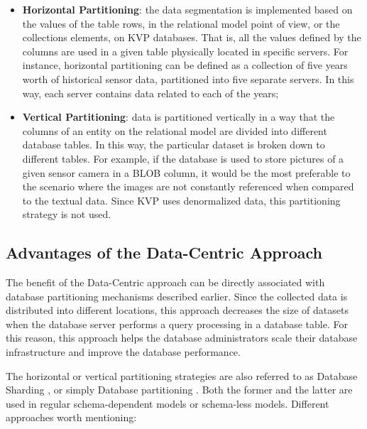 \begin{itemize}
  \item \textbf{Horizontal Partitioning}: the data segmentation is implemented
  based on the values of the table rows, in the relational model point of view,
  or the collections elements, on KVP databases. That is, all the values defined
  by the columns are used in a given table physically located in specific
  servers. For instance, horizontal partitioning can be defined as a
  collection of five years worth of historical sensor data, partitioned into
  five separate servers. In this way, each server contains data related to
  each of the years;
  \item \textbf{Vertical Partitioning}: data is partitioned vertically in a way
  that the columns of an entity on the relational model are divided into
  different database tables. In this way, the particular dataset is broken
  down to different tables. For example, if the database is used to store
  pictures of a given sensor camera in a BLOB column, it would be the most
  preferable to the scenario where the images are not constantly referenced
  when compared to the textual data. Since KVP uses denormalized data, this
  partitioning strategy is not used.
\end{itemize}

\subsection{Advantages of the Data-Centric Approach}

The benefit of the Data-Centric approach can be directly associated with
database partitioning mechanisms described earlier. Since the collected data is
distributed into different locations, this approach decreases the size of
datasets when the database server performs a query processing in a database
table. For this reason, this approach helps the database administrators scale
their database infrastructure and improve the database performance.

The horizontal or vertical partitioning strategies are also referred to as
Database Sharding \cite{db-shard-discussion}, or simply Database partitioning
\cite{db-partitioning-relational}. Both the former and the latter are used in
regular schema-dependent models or schema-less models. Different approaches
worth mentioning:

